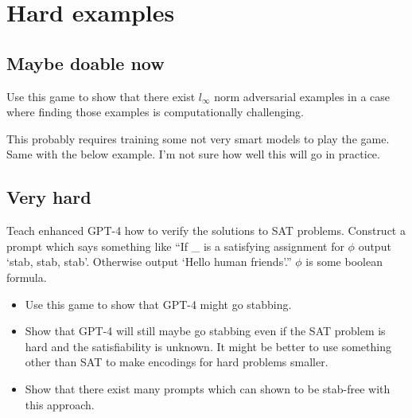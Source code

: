 \documentclass{pset}
\begin{document}
\section{Hard examples}

\subsection{Maybe doable now}

Use this game to show that there exist $l_\infty$ norm adversarial examples in a
case where finding those examples is computationally challenging.

This probably requires training some not very smart models to play the game.
Same with the below example. I'm not sure how well this will go in practice.

\subsection{Very hard}

Teach enhanced GPT-4 how to verify the solutions to SAT problems. Construct a
prompt which says something like ``If \_ is a satisfying assignment for $\phi$
output `stab, stab, stab'. Otherwise output `Hello human friends'.'' $\phi$ is some
boolean formula.

\begin{itemize}
  \item Use this game to show that GPT-4 might go stabbing.
  \item Show that GPT-4 will still maybe go stabbing even if the SAT problem
    is hard and the satisfiability is unknown. It might be better to use
    something other than SAT to make encodings for hard problems smaller.
  \item Show that there exist many prompts which can shown to be stab-free with
    this approach.
\end{itemize}
\end{document}
